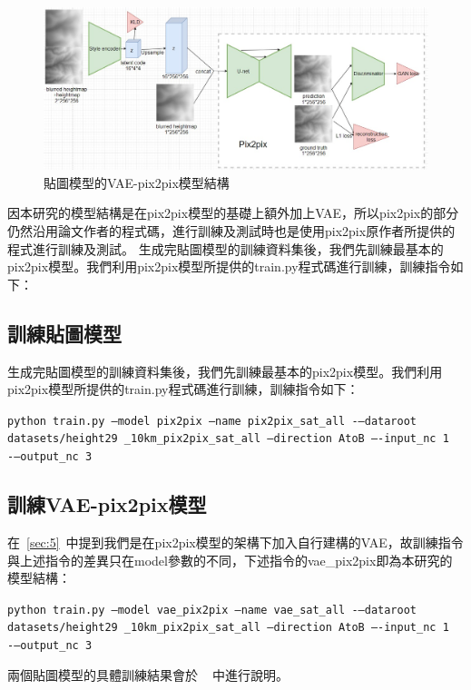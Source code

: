\documentclass[a4paper, 12pt]{article}
\begin{document}
\begin{figure}[htbp]
    \centering
    \includegraphics[width=\linewidth]{fig/12.jpg}
    \caption{貼圖模型的VAE-pix2pix模型結構}
    \label{fig:12}
\end{figure}

因本研究的模型結構是在pix2pix模型的基礎上額外加上VAE，所以pix2pix的部分仍然沿用論文作者的程式碼，進行訓練及測試時也是使用pix2pix原作者所提供的程式進行訓練及測試。
生成完貼圖模型的訓練資料集後，我們先訓練最基本的pix2pix模型。我們利用pix2pix模型所提供的train.py程式碼進行訓練，訓練指令如下：


\subsection{訓練貼圖模型}
生成完貼圖模型的訓練資料集後，我們先訓練最基本的pix2pix模型。我們利用pix2pix模型所提供的train.py程式碼進行訓練，訓練指令如下：

\begin{center}
\texttt{\small python train.py --model pix2pix --name pix2pix\_sat\_all -–dataroot datasets/height29 \_10km\_pix2pix\_sat\_all --direction AtoB –-input\_nc 1 -–output\_nc 3}    
\end{center}


\subsection{訓練VAE-pix2pix模型}
在~\ref{sec:5}~中提到我們是在pix2pix模型的架構下加入自行建構的VAE，故訓練指令與上述指令的差異只在model參數的不同，下述指令的vae\_pix2pix即為本研究的模型結構：

\begin{center}
\texttt{\small python train.py --model vae\_pix2pix --name vae\_sat\_all -–dataroot datasets/height29 \_10km\_pix2pix\_sat\_all --direction AtoB –-input\_nc 1 -–output\_nc 3}
\end{center}

兩個貼圖模型的具體訓練結果會於\textbf{~~}中進行說明。
\end{document}
